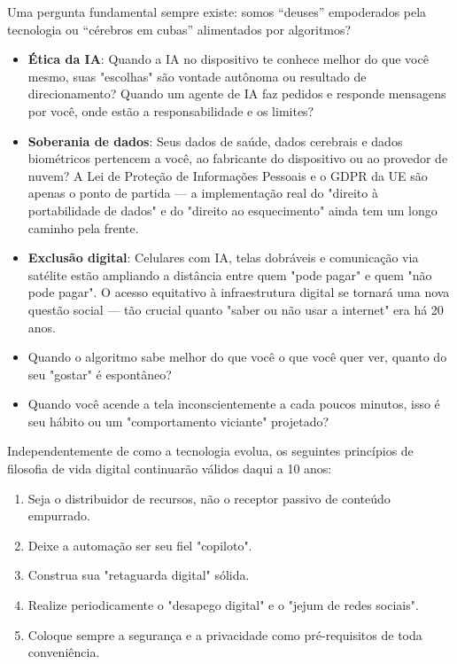 
Uma pergunta fundamental sempre existe: somos “deuses” empoderados pela tecnologia ou “cérebros em cubas” alimentados por algoritmos?

\begin{itemize}
  \item \textbf{Ética da IA}: Quando a IA no dispositivo te conhece melhor do que você mesmo, suas "escolhas" são vontade autônoma ou resultado de direcionamento? Quando um agente de IA faz pedidos e responde mensagens por você, onde estão a responsabilidade e os limites?
  \item \textbf{Soberania de dados}: Seus dados de saúde, dados cerebrais e dados biométricos pertencem a você, ao fabricante do dispositivo ou ao provedor de nuvem? A Lei de Proteção de Informações Pessoais e o GDPR da UE são apenas o ponto de partida — a implementação real do "direito à portabilidade de dados" e do "direito ao esquecimento" ainda tem um longo caminho pela frente.
  \item \textbf{Exclusão digital}: Celulares com IA, telas dobráveis e comunicação via satélite estão ampliando a distância entre quem "pode pagar" e quem "não pode pagar". O acesso equitativo à infraestrutura digital se tornará uma nova questão social — tão crucial quanto "saber ou não usar a internet" era há 20 anos.
  \item Quando o algoritmo sabe melhor do que você o que você quer ver, quanto do seu "gostar" é espontâneo?
  \item Quando você acende a tela inconscientemente a cada poucos minutos, isso é seu hábito ou um "comportamento viciante" projetado?
\end{itemize}


Independentemente de como a tecnologia evolua, os seguintes princípios de filosofia de vida digital continuarão válidos daqui a 10 anos:

\begin{enumerate}
  \item Seja o distribuidor de recursos, não o receptor passivo de conteúdo empurrado.
  \item Deixe a automação ser seu fiel "copiloto".
  \item Construa sua "retaguarda digital" sólida.
  \item Realize periodicamente o "desapego digital" e o "jejum de redes sociais".
  \item Coloque sempre a segurança e a privacidade como pré-requisitos de toda conveniência.
\end{enumerate}

